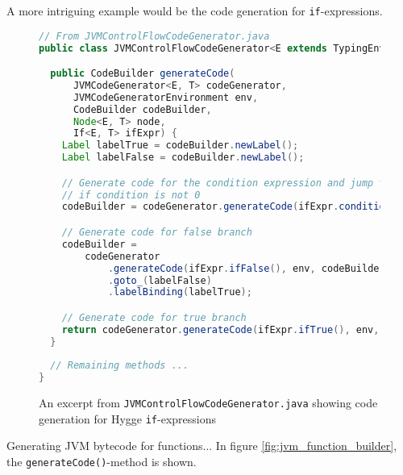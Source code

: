 A more intriguing example would be the code generation for \texttt{if}-expressions.

\begin{figure}[H]
\centering 
\begin{lstlisting}[language=Java]
// From JVMControlFlowCodeGenerator.java
public class JVMControlFlowCodeGenerator<E extends TypingEnvironment, T extends Type> {

  public CodeBuilder generateCode(
      JVMCodeGenerator<E, T> codeGenerator,
      JVMCodeGeneratorEnvironment env,
      CodeBuilder codeBuilder,
      Node<E, T> node,
      If<E, T> ifExpr) {
    Label labelTrue = codeBuilder.newLabel();
    Label labelFalse = codeBuilder.newLabel();

    // Generate code for the condition expression and jump to true branch
    // if condition is not 0
    codeBuilder = codeGenerator.generateCode(ifExpr.condition(), env, codeBuilder).ifne(labelTrue);

    // Generate code for false branch
    codeBuilder =
        codeGenerator
            .generateCode(ifExpr.ifFalse(), env, codeBuilder)
            .goto_(labelFalse)
            .labelBinding(labelTrue);

    // Generate code for true branch
    return codeGenerator.generateCode(ifExpr.ifTrue(), env, codeBuilder).labelBinding(labelFalse);
  }
 
  // Remaining methods ...
}
\end{lstlisting}
\caption{An excerpt from \texttt{JVMControlFlowCodeGenerator.java} showing code generation for Hygge \texttt{if}-expressions}
\label{fig:jvm_if_expressions}
\end{figure}

Generating JVM bytecode for functions... In figure \ref{fig:jvm_function_builder}, the \texttt{generateCode()}-method is shown.

